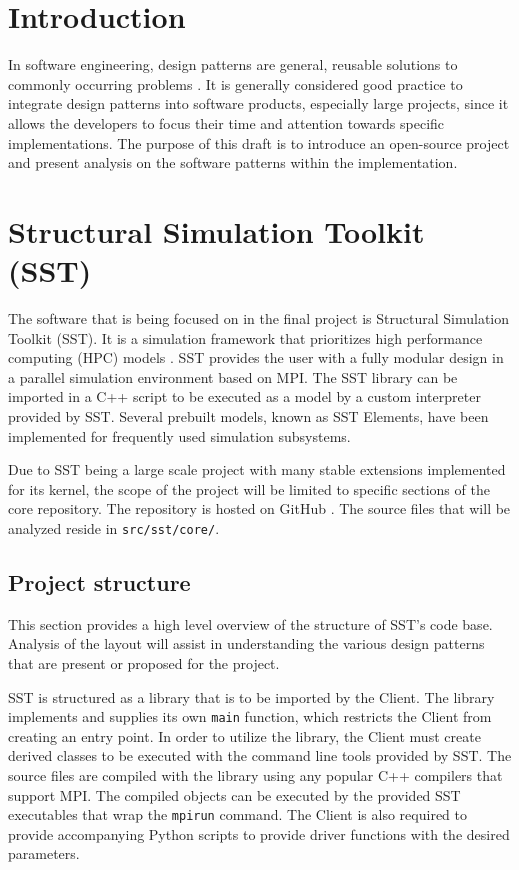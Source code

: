 \section{Introduction}
In software engineering, design patterns are general, reusable solutions to commonly occurring problems \cite{source-making}. It is generally considered good practice to integrate design patterns into software products, especially large projects, since it allows the developers to focus their time and attention towards specific implementations. The purpose of this draft is to introduce an open-source project and present analysis on the software patterns within the implementation.

\section{Structural Simulation Toolkit (SST)}
The software that is being focused on in the final project is Structural Simulation Toolkit (SST). It is a simulation framework that prioritizes high performance computing (HPC) models \cite{sst}. SST provides the user with a fully modular design in a parallel simulation environment based on MPI. The SST library can be imported in a C++ script to be executed as a model by a custom interpreter provided by SST. Several prebuilt models, known as SST Elements, have been implemented for frequently used simulation subsystems.

Due to SST being a large scale project with many stable extensions implemented for its kernel, the scope of the project will be limited to specific sections of the core repository. The repository is hosted on GitHub \cite{sst-repo}. The source files that will be analyzed reside in \texttt{src/sst/core/}.

\subsection{Project structure}
This section provides a high level overview of the structure of SST's code base. Analysis of the layout will assist in understanding the various design patterns that are present or proposed for the project.

SST is structured as a library that is to be imported by the Client. The library implements and supplies its own \texttt{main} function, which restricts the Client from creating an entry point. In order to utilize the library, the Client must create derived classes to be executed with the command line tools provided by SST. The source files are compiled with the library using any popular C++ compilers that support MPI. The compiled objects can be executed by the provided SST executables that wrap the \texttt{mpirun} command. The Client is also required to provide accompanying Python scripts to provide driver functions with the desired parameters.

